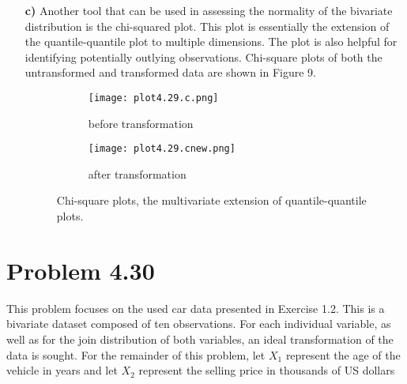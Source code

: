 \begin{enumerate}
	\item[\bf{c)}] Another tool that can be used in assessing the normality of the bivariate distribution is the chi-squared plot. This plot is essentially the extension of the quantile-quantile plot to multiple dimensions. The plot is also helpful for identifying potentially outlying observations. Chi-square plots of both the untransformed and transformed data are shown in Figure 9.
\begin{figure}[H]
\begin{subfigure}{.5\textwidth}
  \centering
	\texttt{[image: plot4.29.c.png]}
  \caption{before transformation}
  \label{fig:sfig1}
\end{subfigure}%
\begin{subfigure}{.5\textwidth}
  \centering
	\texttt{[image: plot4.29.cnew.png]}
  \caption{after transformation}
  \label{fig:sfig2}
\end{subfigure}
\caption{Chi-square plots, the multivariate extension of quantile-quantile plots.}
\end{figure}

\end{enumerate}

\newpage
\section*{Problem 4.30}
This problem focuses on the used car data presented in Exercise 1.2. This is a bivariate dataset composed of ten observations. For each individual variable, as well as for the join distribution of both variables, an ideal transformation of the data is sought. For the remainder of this problem, let $X_1$ represent the age of the vehicle in years and let $X_2$ represent the selling price in thousands of US dollars

